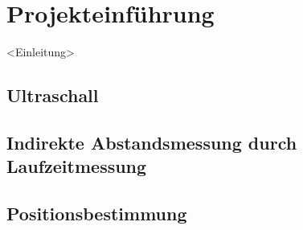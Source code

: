 
\chapter{Projekteinführung}
<Einleitung>


\section{Ultraschall}


\section{Indirekte Abstandsmessung durch Laufzeitmessung}


\section{Positionsbestimmung}

